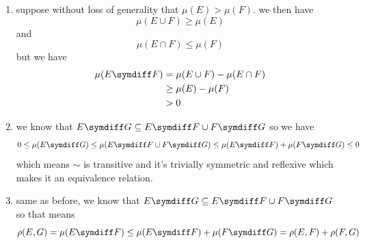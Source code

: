 \documentclass{pset}
\begin{document}
\begin{problem}
    \begin{enumerate}[label=\alph*.]
        \item suppose without loss of generality that $\mu(E)>\mu(F)$. we then have
        $$
        \mu(E\cup F)\geq\mu(E)
        $$
        and
        $$
        \mu(E\cap F)\leq \mu(F)
        $$
        but we have
        \begin{align*}
            \mu(E\symdiff F) &= \mu(E\cup F)-\mu(E\cap F) \\
            &\geq \mu(E)-\mu(F) \\
            &>0
        \end{align*}
        \item we know that $E\symdiff G\subseteq E\symdiff F\cup F\symdiff G$ so we have
        \[
        0 \leq \mu(E \symdiff G) \leq \mu(E \symdiff F \cup F \symdiff G)\leq \mu(E\symdiff F) + \mu(F\symdiff G)\leq 0 
        \]
        which means \(\sim\) is transitive and it's trivially symmetric and reflexive which makes it an equivalence relation.
        \item same as before, we know that \(E \symdiff G \subseteq E \symdiff F \cup F \symdiff G\) so that means
        \[
        \rho(E, G) = \mu(E \symdiff F) 
        \leq \mu(E \symdiff F) + \mu(F \symdiff G)
        = \rho(E, F) + \rho(F, G)
        \]
    \end{enumerate}
\end{problem}
\end{document}
